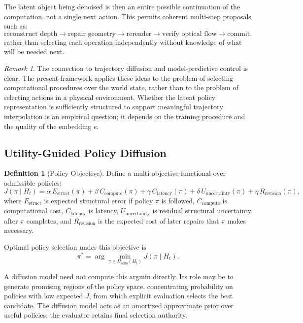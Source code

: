 \documentclass[11pt,a4paper]{article}
\theoremstyle{plain}
\theoremstyle{definition}
\newtheorem{definition}[theorem]{Definition}
\theoremstyle{remark}
\newtheorem{remark}[theorem]{Remark}
\begin{document}
The latent object being denoised is then an entire possible continuation of the computation, not a single next action. This permits coherent multi-step proposals such as:
\[
\text{reconstruct depth} \to \text{repair geometry} \to \text{rerender} \to \text{verify optical flow} \to \text{commit},
\]
rather than selecting each operation independently without knowledge of what will be needed next.

\begin{remark}
The connection to trajectory diffusion \cite{janner2022diffuser} and model-predictive control \cite{garcia1989mpc} is clear. The present framework applies these ideas to the problem of selecting computational procedures over the world state, rather than to the problem of selecting actions in a physical environment. Whether the latent policy representation is sufficiently structured to support meaningful trajectory interpolation is an empirical question; it depends on the training procedure and the quality of the embedding $e$.
\end{remark}

\subsection{Utility-Guided Policy Diffusion}

\begin{definition}[Policy Objective]
Define a multi-objective functional over admissible policies:
\[
J(\pi \mid H_t) =
\alpha\, E_{\mathrm{struct}}(\pi)
+ \beta\, C_{\mathrm{compute}}(\pi)
+ \gamma\, C_{\mathrm{latency}}(\pi)
+ \delta\, U_{\mathrm{uncertainty}}(\pi)
+ \eta\, R_{\mathrm{revision}}(\pi),
\]
where $E_{\mathrm{struct}}$ is expected structural error if policy $\pi$ is followed, $C_{\mathrm{compute}}$ is computational cost, $C_{\mathrm{latency}}$ is latency, $U_{\mathrm{uncertainty}}$ is residual structural uncertainty after $\pi$ completes, and $R_{\mathrm{revision}}$ is the expected cost of later repairs that $\pi$ makes necessary.
\end{definition}

Optimal policy selection under this objective is
\[
\pi^* = \arg\min_{\pi \in \Pi_{\mathrm{adm}}(H_t)} J(\pi \mid H_t).
\]

A diffusion model need not compute this argmin directly. Its role may be to generate promising regions of the policy space, concentrating probability on policies with low expected $J$, from which explicit evaluation selects the best candidate. The diffusion model acts as an amortized approximate prior over useful policies; the evaluator retains final selection authority.
\end{document}
